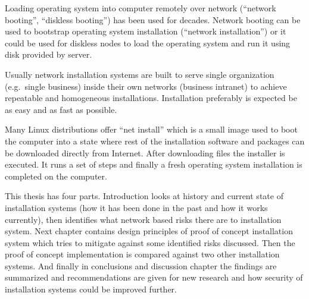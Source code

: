 
\iffalse
FIXME: TODO REMOVE THIS LIST
\begin{itemize}
\item INTRODUCTION: The Setting - bird eye's view - the challenge to be tackled / thing to be be improved in general
\item INTRODUCTION: Past research done
\item INTRODUCTION: Gap in knowledge/problem not yet solved
\item INTRODUCTION: Purpose and method of this work
\item INTRODUCTION: More detailed description what was done
\item INTRODUCTION: Results acquired
\item INTRODUCTION: Analysis and limitations of the result (Mostly relocate to Conclusions)
\item INTRODUCTION: Value (Mostly relocate to Conclusions)
\end{itemize}
\fi

Loading operating system into computer remotely over network
(``network booting'', ``diskless booting'') has been used for
decades. Network booting can be used to bootstrap operating system
installation (``network installation'') or it could be used for
diskless nodes to load the operating system and run it using disk
provided by server.

Usually network installation systems are built to serve single
organization (e.g.\ single business) inside their own networks
(business intranet) to achieve repeatable and homogeneous
installations. Installation preferably is expected be as easy and as
fast as possible.

Many Linux distributions offer ``net install'' which is a small image
used to boot the computer into a state where rest of the installation
software and packages can be downloaded directly from Internet. After
downloading files the installer is executed. It runs a set of steps
and finally a fresh operating system installation is completed on the
computer.

This thesis has four parts. Introduction looks at history and current
state of installation systems (how it has been done in the past and
how it works currently), then identifies what network based risks
there are to installation system. Next chapter contains design
principles of proof of concept installation system which tries to
mitigate against some identified risks discussed. Then the proof of
concept implementation is compared against two other installation
systems. And finally in conclusions and discussion chapter the
findings are summarized and recommendations are given for new research
and how security of installation systems could be improved further.

